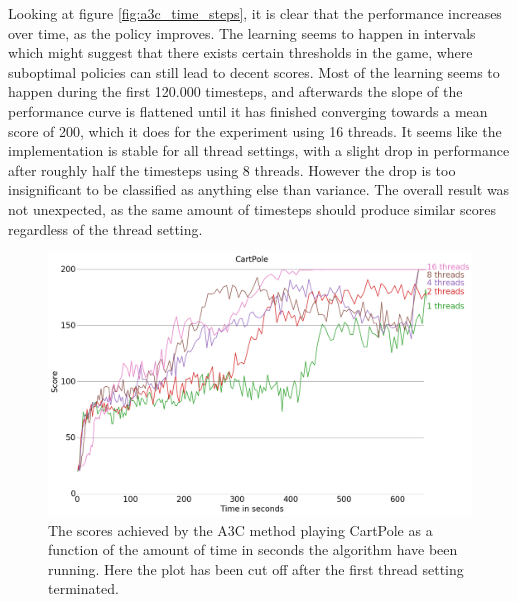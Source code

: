 \documentclass[11pt]{article}
\begin{document}
Looking at figure \ref{fig:a3c_time_steps}, it is clear that the
performance increases over time, as the policy improves.
The learning seems to happen in intervals which might suggest
that there exists certain thresholds in the game, where
suboptimal policies can still lead to decent scores.
Most of the learning seems to happen during the first 120.000 timesteps,
and afterwards the slope of the performance curve
is flattened until it has finished converging towards a mean score
of 200, which it does for the experiment using 16 threads.
It seems like the implementation is stable for all thread settings, with a slight
drop in performance after roughly half the timesteps using 8 threads.
However the drop is too insignificant to be classified as anything else than variance.
The overall result was not unexpected, as the same amount of timesteps should produce similar
scores regardless of the thread setting. 

\begin{figure}[H]
    \centering
    \includegraphics[scale=0.4]{plots/cartpole_compare_time_without_AC.png}
    \caption{The scores achieved by the A3C method playing CartPole as a function
    of the amount of time in seconds the algorithm have been running.
    Here the plot has been cut off after the first thread setting
    terminated.}
    \label{fig:a3c_time}
\end{figure}
\end{document}
